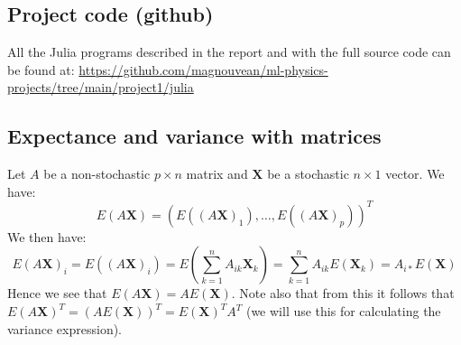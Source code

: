 \documentclass{article}
\begin{document}
\subsection{Project code (github)}
All the Julia programs described in the report and with the full source code can be
found at:
\url{https://github.com/magnouvean/ml-physics-projects/tree/main/project1/julia}

\subsection{Expectance and variance with matrices}
Let $A$ be a non-stochastic $p \times n$ matrix and $\mathbf{X}$ be a stochastic
$n \times 1$ vector. We have:
$$E(A \mathbf{X}) = (E((A \mathbf{X})_1), \dots, E((A \mathbf{X})_p))^T$$
We then have:
$$E(A \mathbf{X})_i = E((A \mathbf{X})_i) = E(\sum_{k=1}^n A_{i k} \mathbf{X}_k) = \sum_{k=1}^n A_{i k} E(\mathbf{X}_k) = A_{i *} E(\mathbf{X})$$
Hence we see that $E(A \mathbf{X}) = A E(\mathbf{X})$.
Note also that from this it follows that $E(A \mathbf{X})^T = (A
    E(\mathbf{X}))^T = E(\mathbf{X})^T A^T$ (we will use this for calculating the
variance expression).
\end{document}

